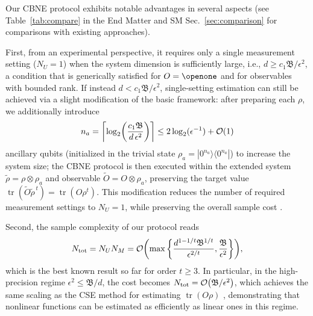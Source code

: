 \documentclass[aps,prl,twocolumn,nofootinbib,superscriptaddress,10pt]{revtex4-2}
\let\originalleft\left
\let\originalright\right
\renewcommand{\left}{\mathopen{}\mathclose\bgroup\originalleft}
\renewcommand{\right}{\aftergroup\egroup\originalright}
\def\>{\rangle}
\def\<{\langle}
\DeclareMathOperator{\Tr}{tr}
\newcommand{\bigo}[1]{\mathcal{O}\left(#1\right)}
\theoremstyle{plain}
\theoremstyle{definition}
\begin{document}
Our CBNE protocol exhibits notable advantages in several aspects  
(see Table~\ref{tab:compare} in the End Matter and SM Sec.~\ref{sec:comparison} for comparisons with existing approaches).

First, from an experimental perspective, it requires only a single measurement setting ($N_U=1$) when the system dimension is sufficiently large, i.e., $d \ge c_1 \mathfrak{B}/\epsilon^2$, a condition that is generically satisfied for $O=\openone$ and for observables with bounded rank. 
If instead $d < c_1 \mathfrak{B}/\epsilon^2$, single-setting estimation can still be achieved via a slight modification of the basic framework:  
after preparing each $\rho$, we additionally introduce
\begin{align} 
n_a=\left\lceil \log_2 \left(\frac{c_1 \mathfrak{B}}{d\,\epsilon^2} \right)\right\rceil
\leq 2\log_2 (\epsilon^{-1}) +\bigo{1}
\end{align}
ancillary qubits (initialized in the trivial state $\rho_a=|0^{n_a}\>\<0^{n_a}|$) to increase the system size; 
the CBNE protocol is then executed within the extended system  \(\tilde{\rho} = \rho \otimes \rho_a\) and observable \(\tilde{O} = O\otimes \rho_a\), preserving the target value \(\Tr(\tilde{O} \tilde{\rho}^{\,t}) = \Tr(O \rho^t)\).  
This modification reduces the number of required measurement settings to $N_U=1$, while preserving the overall sample cost \cite{eff_dim}.



Second, the sample complexity of our protocol reads 
\begin{align} \label{eq:SampleCompCBNE}
N_{\text{tot}}=N_U N_M= \bigo{\max\bigg\lbrace \frac{d^{1-1/t}\mathfrak{B}^{1/t}}{\epsilon^{2/t}}, \frac{\mathfrak{B}}{\epsilon^2} \bigg\rbrace}, 
\end{align}
which is the best known result so far for order $t\geq 3$. 
In particular, in the high-precision regime $\epsilon^2 \le \mathfrak{B}/d$,
the cost becomes $N_{\text{tot}}=\bigo{\mathfrak{B}/\epsilon^2}$, which achieves the same scaling as the CSE method for estimating $\Tr(O\rho)$ \cite{HKPshadow20}, demonstrating that nonlinear functions can be estimated as efficiently as linear ones  in this regime.
\end{document}
